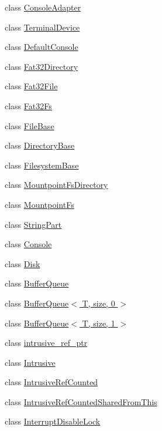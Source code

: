 \begin{DoxyCompactItemize}
class \hyperlink{classmiosix_1_1_console_adapter}{Console\-Adapter}
\item 
class \hyperlink{classmiosix_1_1_terminal_device}{Terminal\-Device}
\item 
class \hyperlink{classmiosix_1_1_default_console}{Default\-Console}
\item 
class \hyperlink{classmiosix_1_1_fat32_directory}{Fat32\-Directory}
\item 
class \hyperlink{classmiosix_1_1_fat32_file}{Fat32\-File}
\item 
class \hyperlink{classmiosix_1_1_fat32_fs}{Fat32\-Fs}
\item 
class \hyperlink{classmiosix_1_1_file_base}{File\-Base}
\item 
class \hyperlink{classmiosix_1_1_directory_base}{Directory\-Base}
\item 
class \hyperlink{classmiosix_1_1_filesystem_base}{Filesystem\-Base}
\item 
class \hyperlink{classmiosix_1_1_mountpoint_fs_directory}{Mountpoint\-Fs\-Directory}
\item 
class \hyperlink{classmiosix_1_1_mountpoint_fs}{Mountpoint\-Fs}
\item 
class \hyperlink{classmiosix_1_1_string_part}{String\-Part}
\item 
class \hyperlink{classmiosix_1_1_console}{Console}
\item 
class \hyperlink{classmiosix_1_1_disk}{Disk}
\item 
class \hyperlink{classmiosix_1_1_buffer_queue}{Buffer\-Queue}
\item 
class \hyperlink{classmiosix_1_1_buffer_queue_3_01_t_00_01size_00_010_01_4}{Buffer\-Queue$<$ T, size, 0 $>$}
\item 
class \hyperlink{classmiosix_1_1_buffer_queue_3_01_t_00_01size_00_011_01_4}{Buffer\-Queue$<$ T, size, 1 $>$}
\item 
class \hyperlink{classmiosix_1_1intrusive__ref__ptr}{intrusive\-\_\-ref\-\_\-ptr}
\item 
class \hyperlink{classmiosix_1_1_intrusive}{Intrusive}
\item 
class \hyperlink{classmiosix_1_1_intrusive_ref_counted}{Intrusive\-Ref\-Counted}
\item 
class \hyperlink{classmiosix_1_1_intrusive_ref_counted_shared_from_this}{Intrusive\-Ref\-Counted\-Shared\-From\-This}
\item 
class \hyperlink{classmiosix_1_1_interrupt_disable_lock}{Interrupt\-Disable\-Lock}
\item 

\end{DoxyCompactItemize}
